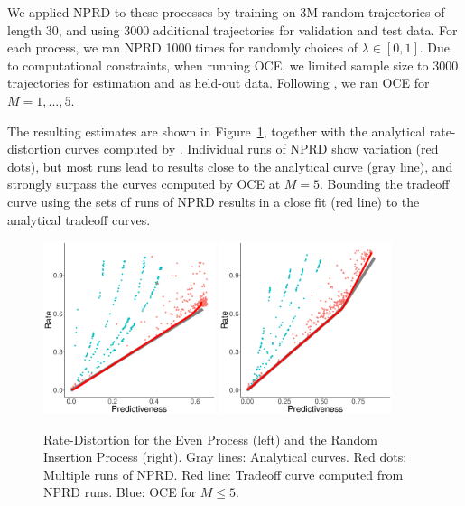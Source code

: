 \documentclass[entropy,article,submit,moreauthors,pdftex,10pt,a4paper]{Definitions/mdpi}
\begin{document}
We applied NPRD to these processes by training on 3M random trajectories of length 30, and using 3000 additional trajectories for validation and test data.
For each process, we ran NPRD 1000 times for randomly choices of $\lambda \in [0,1]$.
Due to computational constraints, when running OCE, we limited sample size to 3000 trajectories for estimation and as held-out data.
Following \cite{marzen-predictive-2016}, we ran OCE for $M=1,...,5$.

The resulting estimates are shown in Figure~\ref{fig:even}, together with the analytical rate-distortion curves computed by \cite{marzen-predictive-2016}.
Individual runs of NPRD show variation (red dots), but most runs lead to results close to the analytical curve (gray line), and strongly surpass the curves computed by OCE at $M=5$.
Bounding the tradeoff curve using the sets of runs of NPRD results in a close fit (red line) to the analytical tradeoff curves.

\begin{figure}
\includegraphics[width=0.45\textwidth]{code/figures/even-info.pdf}
\includegraphics[width=0.45\textwidth]{code/figures/rip-info.pdf}

	\caption{Rate-Distortion for the Even Process (left) and the Random Insertion Process (right). Gray lines: Analytical curves. Red dots: Multiple runs of NPRD. Red line: Tradeoff curve computed from NPRD runs. Blue: OCE for $M\leq 5$. }\label{fig:even}
\end{figure}
\end{document}
